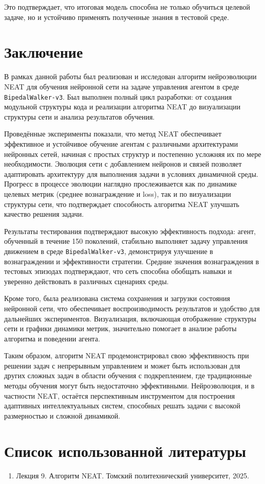 \documentclass[a4paper,12pt]{article}
\begin{document}
Это подтверждает, что итоговая модель способна не только обучиться целевой задаче, но и устойчиво применять полученные знания в тестовой среде.
\newpage
\section{Заключение}


В рамках данной работы был реализован и исследован алгоритм нейроэволюции NEAT для обучения нейронной сети на задаче управления агентом в среде \texttt{BipedalWalker-v3}. Был выполнен полный цикл разработки: от создания модульной структуры кода и реализации алгоритма NEAT до визуализации структуры сети и анализа результатов обучения.

Проведённые эксперименты показали, что метод NEAT обеспечивает эффективное и устойчивое обучение агентам с различными архитектурами нейронных сетей, начиная с простых структур и постепенно усложняя их по мере необходимости. Эволюция сети с добавлением нейронов и связей позволяет адаптировать архитектуру для выполнения задачи в условиях динамичной среды. Прогресс в процессе эволюции наглядно прослеживается как по динамике целевых метрик (среднее вознаграждение и loss), так и по визуализации структуры сети, что подтверждает способность алгоритма NEAT улучшать качество решения задачи.

Результаты тестирования подтверждают высокую эффективность подхода: агент, обученный в течение 150 поколений, стабильно выполняет задачу управления движением в среде \texttt{BipedalWalker-v3}, демонстрируя улучшение в вознаграждении и эффективности стратегии. Средние значения вознаграждения в тестовых эпизодах подтверждают, что сеть способна обобщать навыки и уверенно действовать в различных сценариях среды.

Кроме того, была реализована система сохранения и загрузки состояния нейронной сети, что обеспечивает воспроизводимость результатов и удобство для дальнейших экспериментов. Визуализация, включающая отображение структуры сети и графики динамики метрик, значительно помогает в анализе работы алгоритма и поведении агента.

Таким образом, алгоритм NEAT продемонстрировал свою эффективность при решении задач с непрерывным управлением и может быть использован для других сложных задач в области обучения с подкреплением, где традиционные методы обучения могут быть недостаточно эффективными. Нейроэволюция, и в частности NEAT, остаётся перспективным инструментом для построения адаптивных интеллектуальных систем, способных решать задачи с высокой размерностью и сложной динамикой.
\newpage
\section*{Список использованной литературы}
\begin{enumerate}
    \item Лекция 9. Алгоритм NEAT. Томский политехнический университет, 2025.
\end{enumerate}
\end{document}
